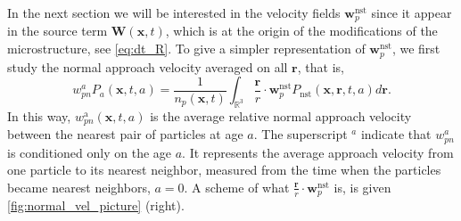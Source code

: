 
In the next section we will be interested in the velocity fields $\textbf{w}_p^\text{nst}$ since it appear in the source term $\textbf{W}(\textbf{x},t)$, which is at the origin of the modifications of the microstructure, see \ref{eq:dt_R}. 
To give a simpler representation of $\textbf{w}_p^\text{nst}$, we first study the normal approach velocity averaged on all $\textbf{r}$, that is,  
\begin{equation*}
    w_{pn}^aP_a(\textbf{x},t,a)
    = \frac{1}{n_p(\textbf{x},t)}
    \int_{\mathbb{R}^3}
    \frac{\textbf{r}}{r} \cdot \textbf{w}^\text{nst}_p
    P_\text{nst}(\textbf{x},\textbf{r},t,a) d\textbf{r}.
\end{equation*}
In this way, $w^\text{a}_{pn}(\textbf{x},t,a)$ is the average relative normal approach velocity between the nearest pair of particles at age $a$. 
The superscript $^a$ indicate that $w_{pn}^a$ is conditioned only on the age $a$. 
It represents the average approach velocity from one particle to its nearest neighbor, measured from the time when the particles became nearest neighbors, $a=0$.
A scheme of what $\frac{\textbf{r}}{r} \cdot \textbf{w}^\text{nst}_p$ is,  is given \ref{fig:normal_vel_picture} (right). 
